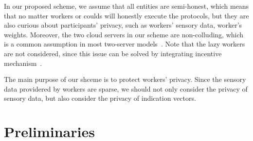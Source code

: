 \documentclass[conference]{IEEEtran}
\begin{document}
In our proposed scheme, we assume that all entities are semi-honest, which means that no matter workers or coulds will honestly execute the protocols, but they are also curious about participants' privacy, such as workers' sensory data, worker's weights.
Moreover, the two cloud servers in our scheme are non-colluding, which is a common assumption in most two-server models~\cite{zhang_lptd_2019,zhang_reliable_2019}.
Note that the lazy workers are not considered, since this issue can be solved by integrating incentive mechanism~\cite{xue_inpptd_2020}.

The main purpose of our shceme is to protect workers' privacy.
Since the sensory data providered by workers are sparse, we should not only consider the privacy of sensory data, but also consider the privacy of indication vectors.









\section{Preliminaries}\label{sec4}
\end{document}
